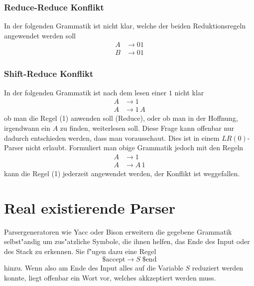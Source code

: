 \subsubsection{Reduce-Reduce Konflikt}
In der folgenden Grammatik ist nicht klar, welche der beiden Reduktionsregeln
angewendet werden soll
\begin{align*}
A&\rightarrow 01\\
B&\rightarrow 01
\end{align*}

\subsubsection{Shift-Reduce Konflikt}
In der folgenden Grammatik ist nach dem lesen einer $1$ nicht klar
\begin{align*}
A&\rightarrow 1\tag{1}\\
A&\rightarrow 1\,A\tag{2}
\end{align*}
ob man die Regel (1) anwenden soll (Reduce), oder ob man
in der Hoffnung, irgendwann ein $A$ zu finden, weiterlesen
soll. Diese Frage kann offenbar nur dadurch entschieden werden, dass
man vorausschaut. Dies ist in einem $LR(0)$-Parser nicht erlaubt.
Formuliert man obige Grammatik jedoch mit den Regeln
\begin{align*}
A&\rightarrow 1\tag{1}\\
A&\rightarrow A\,1\tag{2}
\end{align*}
kann die Regel (1) jederzeit angewendet werden, der Konflikt ist
weggefallen. 

\section{Real existierende Parser}
Parsergeneratoren wie Yacc oder Bison erweitern die gegebene Grammatik
selb\-st"andig um zus"atzliche Symbole, die ihnen helfen, das Ende
des Input oder des Stack zu erkennen. Sie f"ugen dazu eine
Regel
\[
\text{\$accept}\rightarrow S\; \text{\$end}
\]
hinzu. Wenn also am Ende des Input alles auf die Variable $S$ reduziert
werden konnte, liegt offenbar ein Wort vor, welches akkzeptiert werden
muss.

